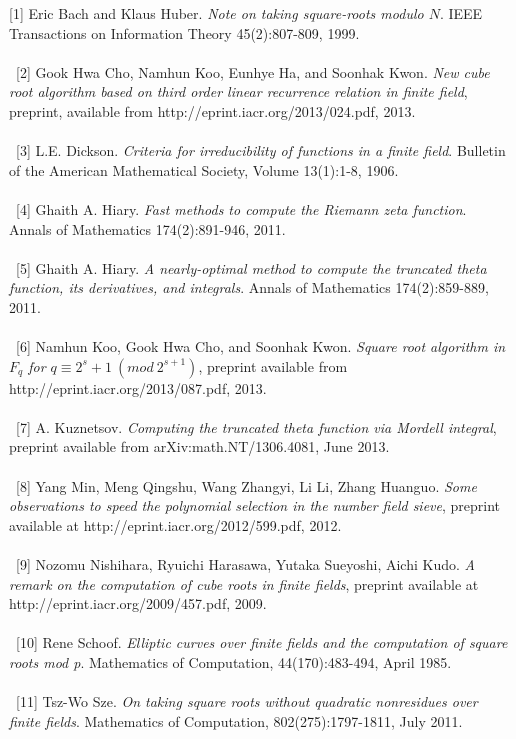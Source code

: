\documentclass[final,letterpaper,oneside,10pt]{article}
\begin{document}
[1] Eric Bach and Klaus Huber. \textit{Note on taking square-roots modulo $N$}.  IEEE Transactions on Information Theory 45(2):807-809, 1999.
\\
\\
\
[2] Gook Hwa Cho, Namhun Koo, Eunhye Ha, and Soonhak Kwon. \textit{New cube root algorithm based on third order linear recurrence relation in
finite field}, preprint, available from http://eprint.iacr.org/2013/024.pdf, 2013.
\\
\\
\
[3] L.E. Dickson. \textit{Criteria for irreducibility of functions in a finite field}.  Bulletin of the American Mathematical Society, Volume 13(1):1-8, 1906.
\\
\\
\
[4] Ghaith A. Hiary. \textit{Fast methods to compute the Riemann zeta function}.  Annals of Mathematics 174(2):891-946, 2011.
\\
\\
\
[5] Ghaith A. Hiary. \textit{A nearly-optimal method to compute the truncated theta function, its derivatives, and integrals}.  Annals of Mathematics 
174(2):859-889, 2011.
\\
\\
\
[6] Namhun Koo, Gook Hwa Cho, and Soonhak Kwon. \textit{Square root algorithm in $F_q$ for $q \equiv 2^s+1~(mod~2^{s+1})$}, preprint available
from 
\\
 http://eprint.iacr.org/2013/087.pdf, 2013.
\\
\\
\
[7]  A. Kuznetsov. \textit{Computing the truncated theta function via Mordell integral}, preprint available from arXiv:math.NT/1306.4081, June 2013.
\\
\\
\
[8] Yang Min, Meng Qingshu, Wang Zhangyi, Li Li, Zhang Huanguo. \textit{Some observations to speed the polynomial selection in the number field
sieve}, preprint available at http://eprint.iacr.org/2012/599.pdf, 2012.
\\
\\
\
[9] Nozomu Nishihara, Ryuichi Harasawa, Yutaka Sueyoshi, Aichi Kudo. \textit{A remark on the computation of cube roots in finite fields}, preprint
available at http://eprint.iacr.org/2009/457.pdf, 2009.
\\
\\
\
[10] Rene Schoof. \textit{Elliptic curves over finite fields and the computation of square roots mod p}.  Mathematics of Computation, 44(170):483-494,
April 1985.
\\
\\
\
[11] Tsz-Wo Sze. \textit{On taking square roots without quadratic nonresidues over finite fields}.  Mathematics of Computation, 802(275):1797-1811, 
July 2011.
\end{document}
